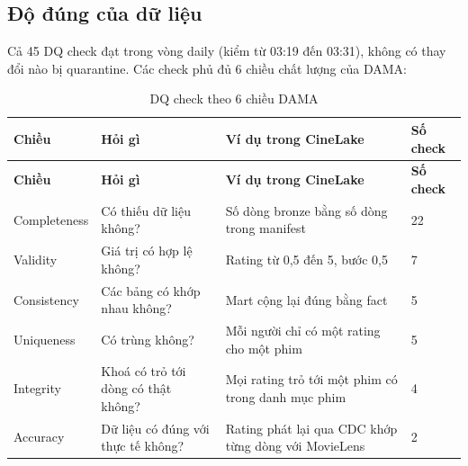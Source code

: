 \documentclass[a4paper,11pt]{article}
\newlength{\reporttablewidth}
\begin{document}
\subsection{Độ đúng của dữ liệu}\label{sec:5.1}

Cả 45 DQ check đạt trong vòng daily (kiểm từ 03:19 đến 03:31), không có thay đổi nào bị quarantine. Các check phủ đủ 6 chiều chất lượng của DAMA:

\begingroup
\small
{}
\setlength{\tabcolsep}{4pt}
\renewcommand{\arraystretch}{1.18}
\setlength{\reporttablewidth}{\dimexpr\linewidth-6\tabcolsep\relax}
\begin{longtable}{@{}L{0.17\reporttablewidth} L{0.24\reporttablewidth} L{0.47\reporttablewidth} L{0.12\reporttablewidth}@{}}
\caption[DQ check theo 6 chiều DAMA (mục 5.1)]{DQ check theo 6 chiều DAMA}\label{tab:16} \\
\toprule
\textbf{Chiều} & \textbf{Hỏi gì} & \textbf{Ví dụ trong CineLake} & \textbf{Số check} \\
\midrule
\endfirsthead
\toprule
\textbf{Chiều} & \textbf{Hỏi gì} & \textbf{Ví dụ trong CineLake} & \textbf{Số check} \\
\midrule
\endhead
\midrule
\endfoot
\bottomrule
\endlastfoot
Completeness & Có thiếu dữ liệu không? & Số dòng bronze bằng số dòng trong manifest & 22 \\
Validity & Giá trị có hợp lệ không? & Rating từ 0,5 đến 5, bước 0,5 & 7 \\
Consistency & Các bảng có khớp nhau không? & Mart cộng lại đúng bằng fact & 5 \\
Uniqueness & Có trùng không? & Mỗi người chỉ có một rating cho một phim & 5 \\
Integrity & Khoá có trỏ tới dòng có thật không? & Mọi rating trỏ tới một phim có trong danh mục phim & 4 \\
Accuracy & Dữ liệu có đúng với thực tế không? & Rating phát lại qua CDC khớp từng dòng với MovieLens & 2 \\
\end{longtable}
\endgroup
\end{document}
